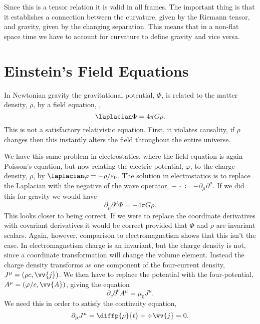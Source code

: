 \documentclass[fleqn]{NotesClass}
\newcommand*{\dalembertian}{\mathop{\square}}
\begin{document}
    Since this is a tensor relation it is valid in all frames.
    The important thing is that it establishes a connection between the curvature, given by the Riemann tensor, and gravity, given by the changing separation.
    This means that in a non-flat space time we have to account for curvature to define gravity and vice versa.
    
    \section{Einstein's Field Equations}
    In Newtonian gravity the gravitational potential, \(\Phi\), is related to the matter density, \(\rho\), by a field equation, ,
    \begin{equation}
        \laplacian\Phi = 4\pi G\rho.
    \end{equation}
    This is not a satisfactory relativistic equation.
    First, it violates causality, if \(\rho\) changes then this instantly alters the field throughout the entire universe.
    
    We have this same problem in electrostatics, where the field equation is again Poisson's equation, but now relating the electric potential, \(\varphi\), to the charge density, \(\rho\), by \(\laplacian \varphi = -\rho/\varepsilon_0\).
    The solution in electrostatics is to replace the Laplacian with the negative of the wave operator, \(-\dalembertian \coloneqq -\partial_\mu\partial^\mu\).
    If we did this for gravity we would have
    \begin{equation}
        \partial_\mu\partial^\mu \Phi = -4\pi G\rho.
    \end{equation}
    This looks closer to being correct.
    If we were to replace the coordinate derivatives with covariant derivatives it would be correct provided that \(\Phi\) and \(\rho\) are invariant scalars.
    Again, however, comparison to electromagnetism shows that this isn't the case.
    In electromagnetism charge is an invariant, but the charge density is not, since a coordinate transformation will change the volume element.
    Instead the charge density transforms as one component of the four-current density, \(J^\mu = (\rho c, \vv{j})\).
    We then have to replace the potential with the four-potential, \(A^\mu = (\varphi/c, \vv{A})\), giving the equation
    \begin{equation}
        \partial_\nu \partial^\nu A^\mu = \mu_0 J^\mu.
    \end{equation}
    We need this in order to satisfy the continuity equation,
    \begin{equation}
        \partial_\mu J^\mu = \diffp{\rho}{t} + \div\vv{j} = 0.
    \end{equation}
    
\end{document}

